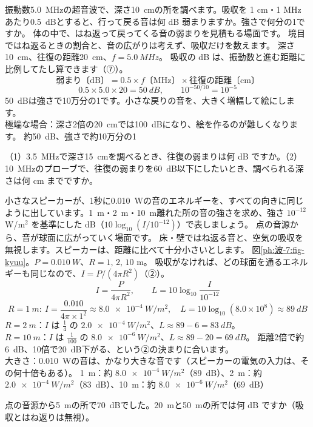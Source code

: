 \label{ph:波-7:ex9}
\begin{phreidai}
振動数\qty{5.0}{MHz}の超音波で、深さ\qty{10}{cm}の所を調べます。吸収を 1 cm・1 MHz あたり\qty{0.5}{dB}とすると、行って戻る音は何 dB 弱まりますか。強さで何分の1ですか。
\phbamen
体の中で、はね返って戻ってくる音の弱まりを見積もる場面です。
\phmushi
境目ではね返るときの割合と、音の広がりは考えず、吸収だけを数えます。
\phzu
深さ\qty{10}{cm}、往復の距離\qty{20}{cm}、$f=\qty{5.0}{MHz}$。
\phriyu
吸収の dB は、振動数と進む距離に比例してたし算できます（⑦）。
\phtateru
\[\text{弱まり〔dB〕}=0.5\times f\text{〔MHz〕}\times\text{往復の距離〔cm〕}\]
\phtoku
\[0.5\times5.0\times20=\qty{50}{dB},\qquad10^{-50/10}=10^{-5}\]
\phtashikame
\qty{50}{dB}は強さで10万分の1です。小さな戻りの音を、大きく増幅して絵にします。\\
極端な場合：深さ2倍の\qty{20}{cm}では\qty{100}{dB}になり、絵を作るのが難しくなります。
\kotae 約\qty{50}{dB}、強さで約10万分の1
\end{phreidai}
\begin{jibun}
（1）\qty{3.5}{MHz}で深さ\qty{15}{cm}を調べるとき、往復の弱まりは何 dB ですか。（2）\qty{10}{MHz}のプローブで、往復の弱まりを\qty{60}{dB}以下にしたいとき、調べられる深さは何 cm までですか。
\end{jibun}

\label{ph:波-7:ex10}
\begin{phreidai}
小さなスピーカーが、1秒に\qty{0.010}{W}の音のエネルギーを、すべての向きに同じように出しています。\qty{1}{m}・\qty{2}{m}・\qty{10}{m}離れた所の音の強さを求め、強さ $10^{-12}$ W/m$^2$ を基準にした dB（$10\log_{10}(I/10^{-12})$）で表しましょう。
\phbamen
点の音源から、音が球面に広がっていく場面です。
\phmushi
床・壁ではね返る音と、空気の吸収を無視します。スピーカーは、距離に比べて十分小さいとします。
\phzu
図\ref{ph:波-7:fig-kyuu}。$P=\qty{0.010}{W}$、$R=1,\,2,\,10$ m。
\phriyu
吸収がなければ、どの球面を通るエネルギーも同じなので、$I=P/(4\pi R^2)$（②）。
\phtateru
\[I=\frac{P}{4\pi R^2},\qquad L=10\log_{10}\frac{I}{10^{-12}}\]
\phtoku
\[R=\qty{1}{m}:\ I=\frac{0.010}{4\pi\times1^2}\approx\qty{8.0e-4}{W/m^2},\quad L=10\log_{10}(8.0\times10^8)\approx\qty{89}{dB}\]
$R=\qty{2}{m}$：$I$ は $\tfrac14$ の $\qty{2.0e-4}{W/m^2}$、$L\approx89-6=\qty{83}{dB}$。\\
$R=\qty{10}{m}$：$I$ は $\tfrac1{100}$ の $\qty{8.0e-6}{W/m^2}$、$L\approx89-20=\qty{69}{dB}$。
\phtashikame
距離2倍で約\qty{6}{dB}、10倍で\qty{20}{dB}下がる、という②の決まりに合います。\\
大きさ：\qty{0.010}{W}の音は、かなり大きな音です（スピーカーの電気の入力は、その何十倍もある）。
\kotae \qty{1}{m}：約 $\qty{8.0e-4}{W/m^2}$（\qty{89}{dB}）、\qty{2}{m}：約 $\qty{2.0e-4}{W/m^2}$（\qty{83}{dB}）、\qty{10}{m}：約 $\qty{8.0e-6}{W/m^2}$（\qty{69}{dB}）
\end{phreidai}
\begin{jibun}
点の音源から\qty{5}{m}の所で\qty{70}{dB}でした。\qty{20}{m}と\qty{50}{m}の所では何 dB ですか（吸収とはね返りは無視）。
\end{jibun}

